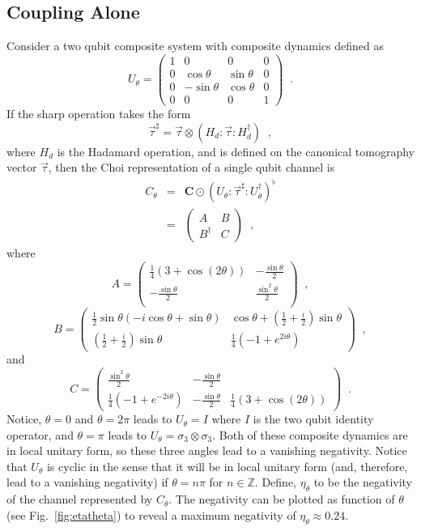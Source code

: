 \subsection{Coupling Alone}
\label{sec:couplingalone}
Consider a two qubit composite system with composite dynamics defined as
$$
U_\theta = \begin{pmatrix}
1&0&0&0\\
0&\cos\theta&\sin\theta&0\\
0&-\sin\theta&\cos\theta&0\\
0&0&0&1
\end{pmatrix}\;\;.
$$
If the sharp operation takes the form
$$
\vec{\tau}^\sharp = \vec{\tau}\otimes\left(H_d:\vec{\tau}: H_d^\dagger\right)\;\;,
$$
where $H_d$ is the Hadamard operation, and is defined on the canonical tomography vector $\vec{\tau}$, then the Choi representation of a single qubit channel is
\begin{eqnarray*}
C_\theta &=& \mathbf{C}\odot \left(U_\theta:\vec{\tau}^\sharp :U_\theta^\dagger\right)^\flat\\
&=& \begin{pmatrix}
A & B\\
B^\dagger & C
\end{pmatrix}\;\;,
\end{eqnarray*}
where
$$
A =\begin{pmatrix}
 \frac{1}{4} (3+\cos\left(2 \theta\right)) & -\frac{\sin\theta}{2}  \\
 -\frac{\sin\theta}{2} & \frac{\sin^2\theta}{2} \\
\end{pmatrix}\;\;,
$$
$$
B = \begin{pmatrix}
 \frac{1}{2} \sin\theta (-i \cos\theta+\sin\theta) & \cos\theta+\left(\frac{1}{2}+\frac{i}{2}\right) \sin\theta \\
 \left(\frac{1}{2}+\frac{i}{2}\right) \sin\theta & \frac{1}{4} \left(-1+e^{2 i \theta}\right) 
\end{pmatrix}\;\;,
$$
and
$$
C = \begin{pmatrix}
 \frac{\sin^2\theta}{2} & -\frac{\sin\theta}{2} \\
 \frac{1}{4} \left(-1+e^{-2 i \theta}\right) & -\frac{\sin\theta}{2} & \frac{1}{4} (3+\cos\left(2 \theta\right))
\end{pmatrix}\;\;.
$$
Notice, $\theta=0$ and $\theta=2\pi$ leads to $U_\theta=I$ where $I$ is the two qubit identity operator, and $\theta=\pi$ leads to $U_\theta=\sigma_3\otimes\sigma_3$.  Both of these composite dynamics are in local unitary form, so these three angles lead to a vanishing negativity.  Notice that $U_\theta$ is cyclic in the sense that it will be in local unitary form (and, therefore, lead to a vanishing negativity) if $\theta=n\pi$ for $n\in\mathbb{Z}$.  Define, $\eta_\theta$ to be the negativity of the channel represented by $C_\theta$.  The negativity can be plotted as function of $\theta$ (see Fig.\ \ref{fig:etatheta}) to reveal a maximum negativity of $\eta_\theta\approx 0.24$.  
